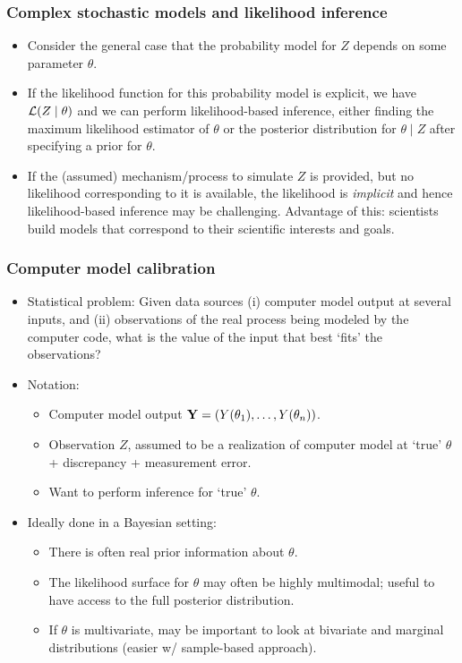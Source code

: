 \documentclass{beamer}
\begin{document}
\begin{frame}
  \frametitle{Complex stochastic models and likelihood inference }
\begin{itemize}
\item Consider the general case that the probability model for $Z$
  depends on some parameter $\theta$.
\item If the likelihood function for this probability model is
  explicit, we have ${\cal L}(Z\mid \theta)$ and we can perform
  likelihood-based inference, either finding the maximum likelihood
  estimator of $\theta$ or the posterior distribution for $\theta \mid
  Z$ after specifying a prior for $\theta$.
\item If the (assumed) mechanism/process to simulate $Z$ is provided,
  but no likelihood corresponding to it is available, the likelihood
  is {\it implicit} and hence likelihood-based inference may be
  challenging. Advantage of this: scientists build models that
  correspond to their scientific interests and goals. 
\end{itemize}
\end{frame}

\begin{frame}
  \frametitle{Computer model calibration }
  \begin{itemize}
  \item Statistical problem: Given data sources (i) computer model
    output at several inputs, and (ii) observations of the real process
    being modeled by the computer code, what is the value of the input
    that best `fits' the observations?
  \item Notation: 
\begin{itemize}
\item Computer model output ${\bf Y} = (Y(\theta_1),\dots, Y(\theta_n))$.
\item Observation $Z$, assumed to be a realization of computer model
  at `true' $\theta$ + discrepancy + measurement error.
\item Want to perform inference for `true' $\theta$.
  \end{itemize}
\item Ideally done in a Bayesian setting:
\begin{itemize}
\item There is
  often real prior information about $\theta$. 
\item The likelihood surface for $\theta$ may often be highly
multimodal; useful to have access to the full posterior distribution.
\item If $\theta$ is multivariate, may be important to look at
  bivariate and marginal distributions (easier w/ sample-based approach).
  \end{itemize}
  \end{itemize}
\end{frame}
\end{document}
